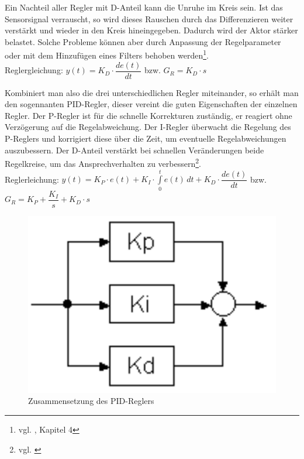 Ein Nachteil aller Regler mit D-Anteil kann die Unruhe im Kreis sein. Ist das Sensorsignal verrauscht, so wird dieses Rauschen durch das Differenzieren weiter verstärkt und wieder in den Kreis hineingegeben. Dadurch wird der Aktor stärker belastet. Solche Probleme können aber durch Anpassung der Regelparameter oder mit dem Hinzufügen eines Filters behoben werden\footnote{vgl. \cite{AUT5}, Kapitel 4}.
\\[4mm]
Reglergleichung: \hspace{7mm} $y(t) = K_D \cdot \dfrac{de(t)}{dt}$\hspace{5mm} bzw. \hspace{5mm} $G_R = K_D \cdot s$

\newpage

Kombiniert man also die drei unterschiedlichen Regler miteinander, so erhält man den sogennanten PID-Regler, dieser vereint die guten Eigenschaften der einzelnen Regler. Der P-Regler ist für die schnelle Korrekturen zuständig, er reagiert ohne Verzögerung auf die Regelabweichung. Der I-Regler überwacht die Regelung des P-Reglers und korrigiert diese über die Zeit, um eventuelle Regelabweichungen auszubessern. Der D-Anteil verstärkt bei schnellen Veränderungen beide Regelkreise, um das Ansprechverhalten zu verbessern\footnote{vgl. \cite{PID-Regler}}.
\\[4mm]
Reglerleichung: \hspace{3mm} $y(t) = K_P \cdot e(t) + K_I \cdot \int\limits_{0}^{t} e(t) \,dt + K_D \cdot \dfrac{de(t)}{dt}$ \hspace{3mm} bzw. \hspace{3mm} $G_R = K_P + \dfrac{K_I}{s} + K_D \cdot s$
\\[5mm]
\begin{figure}[H]
	\begin{center}
		\includegraphics[scale=0.15]{figures/antrieb/PID_Regler.png}
		\caption{Zusammensetzung des PID-Reglers\cite{Regelungstechnik}}
	\end{center}
\end{figure}
